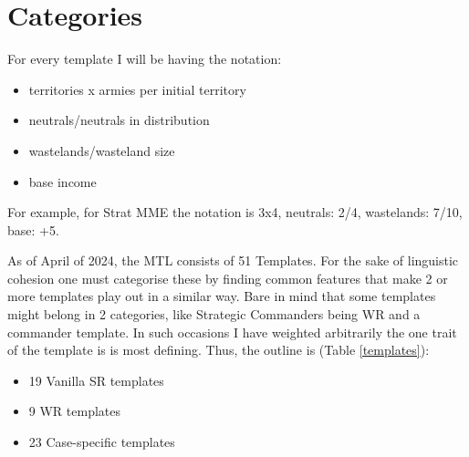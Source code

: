 \newpage
\section{Categories} \label{Categories}

For every template I will be having the notation:
\begin{itemize}
    \item territories x armies per initial territory
    \item neutrals/neutrals in distribution
    \item wastelands/wasteland size
    \item base income
\end{itemize}

For example, for Strat MME the notation is 3x4, neutrals: 2/4, wastelands: 7/10, base: +5.

As of April of 2024, the MTL consists of 51 Templates. For the sake of linguistic cohesion one must categorise these by finding common features that make 2 or more templates play out in a similar way. Bare in mind that some templates might belong in 2 categories, like Strategic Commanders being WR and a commander template. In such occasions I have weighted arbitrarily the one trait of the template is is most defining. Thus, the outline is (Table \ref{templates}):

\begin{itemize}
    \item 19 Vanilla SR templates
    \item 9 WR templates 
    \item 23 Case-specific templates
\end{itemize}



